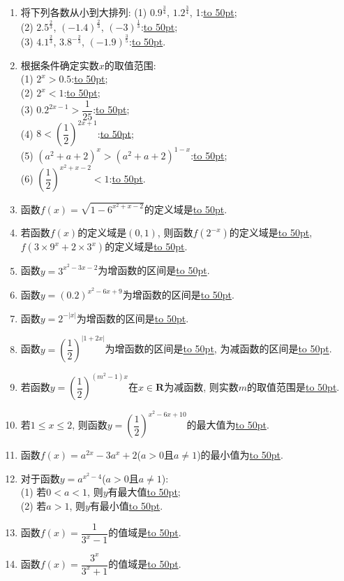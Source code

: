 \documentclass[10pt,a4paper]{article}
\newcommand{\blank}[1]{\underline{\hbox to #1pt{}}}
\begin{document}
\begin{enumerate}[1.]
(4) $9^{\frac 13}$\blank{50}$3^{\frac 43}$;\\
(5) $2^{\frac 23}$\blank{50}$3.6^{-\frac 34}$;\\
(6) $0.8^{-2}$\blank{50}$(\dfrac 53)^{-\frac 12}$.
\item 将下列各数从小到大排列:
(1) $0.9^{\frac 34}$, $1.2^{\frac 34}$, 1:\blank{50};\\
(2) $2.5^{\frac 23}$, $(-1.4)^{\frac 23}$, $(-3)^{\frac 13}$:\blank{50};\\
(3) $4.1^{\frac 23}$, $3.8^{-\frac 23}$, $(-1.9)^{\frac 35}$:\blank{50}.
\item 根据条件确定实数$x$的取值范围:\\
(1) $2^x>0.5$:\blank{50};\\
(2) $2^x<1$:\blank{50};\\
(3) $0.2^{2x-1}>\dfrac 1{25}$:\blank{50};\\
(4) $8<(\dfrac 12)^{2x+1}$:\blank{50};\\
(5) $(a^2+a+2)^x>(a^2+a+2)^{1-x}$:\blank{50};\\
(6) $(\dfrac 12)^{x^2+x-2}<1$:\blank{50}.
\item 函数$f(x)=\sqrt {1-6^{x^2+x-2}}$的定义域是\blank{50}.
\item 若函数$f(x)$的定义域是$(0, 1)$, 则函数$f(2^{-x})$的定义域是\blank{50}, $f(3\times 9^x+2\times 3^x)$的定义域是\blank{50}.
\item 函数$y=3^{x^2-3x-2}$为增函数的区间是\blank{50}.
\item 函数$y=(0.2)^{x^2-6x+9}$为增函数的区间是\blank{50}.
\item 函数$y=2^{-|x|}$为增函数的区间是\blank{50}.
\item 函数$y=(\dfrac 12)^{|1+2x|}$为增函数的区间是\blank{50}, 为减函数的区间是\blank{50}.
\item 若函数$y=(\dfrac 12)^{(m^2-1)x}$在$x\in \mathbf{R}$为减函数, 则实数$m$的取值范围是\blank{50}.
\item 若$1\le x\le 2$, 则函数$y=(\dfrac 12)^{x^2-6x+10}$的最大值为\blank{50}.
\item 函数$f(x)=a^{2x}-3a^x+2$($a>0$且$a\ne 1$)的最小值为\blank{50}.
\item 对于函数$y=a^{x^2-4}$($a>0$且$a\ne 1$):\\
(1) 若$0<a<1$, 则$y$有最大值\blank{50};\\
(2) 若$a>1$, 则$y$有最小值\blank{50}.
\item 函数$f(x)=\dfrac 1{3^x-1}$的值域是\blank{50}.
\item 函数$f(x)=\dfrac{3^x}{3^x+1}$的值域是\blank{50}.

\end{enumerate}
\end{document}
